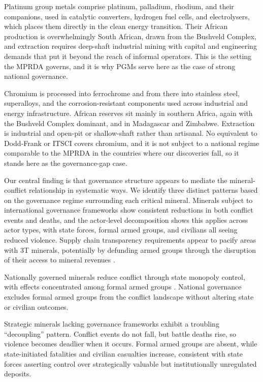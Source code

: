 \documentclass[11pt]{article}
\begin{document}
Platinum group metals comprise platinum, palladium, rhodium, and their companions, used in catalytic converters, hydrogen fuel cells, and electrolysers, which places them directly in the clean energy transition. Their African production is overwhelmingly South African, drawn from the Bushveld Complex, and extraction requires deep-shaft industrial mining with capital and engineering demands that put it beyond the reach of informal operators. This is the setting the MPRDA governs, and it is why PGMs serve here as the case of strong national governance.

Chromium is processed into ferrochrome and from there into stainless steel, superalloys, and the corrosion-resistant components used across industrial and energy infrastructure. African reserves sit mainly in southern Africa, again with the Bushveld Complex dominant, and in Madagascar and Zimbabwe. Extraction is industrial and open-pit or shallow-shaft rather than artisanal. No equivalent to Dodd-Frank or ITSCI covers chromium, and it is not subject to a national regime comparable to the MPRDA in the countries where our discoveries fall, so it stands here as the governance-gap case.

Our central finding is that governance structure appears to mediate the mineral-conflict relationship in systematic ways. We identify three distinct patterns based on the governance regime surrounding each critical mineral. Minerals subject to international governance frameworks show consistent reductions in both conflict events and deaths, and the actor-level decomposition shows this applies across actor types, with state forces, formal armed groups, and civilians all seeing reduced violence. Supply chain transparency requirements appear to pacify areas with 3T minerals, potentially by defunding armed groups through the disruption of their access to mineral revenues \citep{parker2016resource, stoop2018dodd, bloem2022conflict}.

Nationally governed minerals reduce conflict through state monopoly control, with effects concentrated among formal armed groups \citep{cawood2004mineral}. National governance excludes formal armed groups from the conflict landscape without altering state or civilian outcomes.

Strategic minerals lacking governance frameworks exhibit a troubling ``decoupling'' pattern. Conflict events do not fall, but battle deaths rise, so violence becomes deadlier when it occurs. Formal armed groups are absent, while state-initiated fatalities and civilian casualties increase, consistent with state forces asserting control over strategically valuable but institutionally unregulated deposits.
\end{document}
